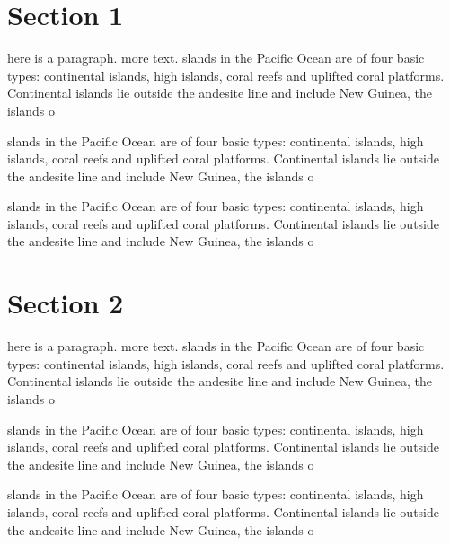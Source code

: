 \documentclass[11pt]{article}
\begin{document}
\section{Section 1}
here is a paragraph. more text. slands in the Pacific Ocean are of four basic types: continental islands, high islands, coral reefs and uplifted coral platforms. Continental islands lie outside the andesite line and include New Guinea, the islands o

slands in the Pacific Ocean are of four basic types: continental islands, high islands, coral reefs and uplifted coral platforms. Continental islands lie outside the andesite line and include New Guinea, the islands o

slands in the Pacific Ocean are of four basic types: continental islands, high islands, coral reefs and uplifted coral platforms. Continental islands lie outside the andesite line and include New Guinea, the islands o
\section{Section 2}
here is a paragraph. more text. slands in the Pacific Ocean are of four basic types: continental islands, high islands, coral reefs and uplifted coral platforms. Continental islands lie outside the andesite line and include New Guinea, the islands o

slands in the Pacific Ocean are of four basic types: continental islands, high islands, coral reefs and uplifted coral platforms. Continental islands lie outside the andesite line and include New Guinea, the islands o

slands in the Pacific Ocean are of four basic types: continental islands, high islands, coral reefs and uplifted coral platforms. Continental islands lie outside the andesite line and include New Guinea, the islands o
\end{document}
